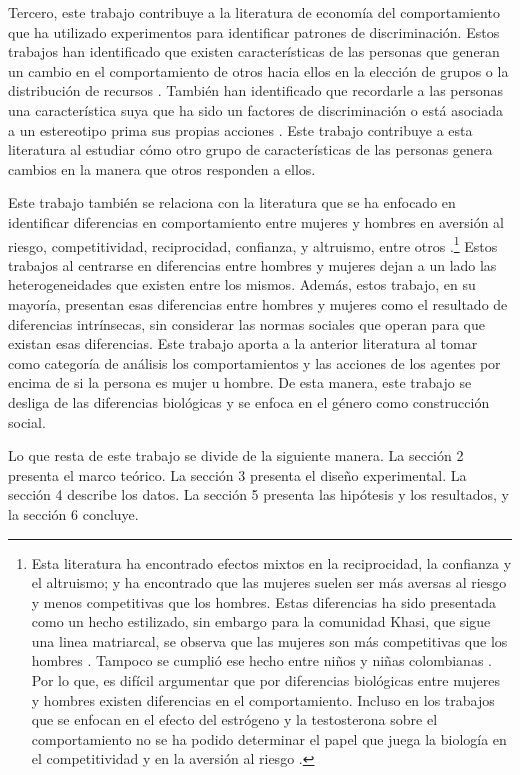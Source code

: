 Tercero, este trabajo contribuye a la literatura de economía del comportamiento que ha utilizado experimentos para identificar patrones de discriminación. Estos trabajos han identificado que existen características de las personas que generan un cambio en el comportamiento de otros hacia ellos en la elección de grupos o la distribución de recursos  \citep{cardenas2008discrimination, beautifulorwhite2012, howyoulookorspeak, mobius2006whybeautymatters}. También han identificado que recordarle a las personas una característica suya que ha sido un factores de discriminación o está asociada a un estereotipo prima sus propias acciones  \citep{hoffdiscriminationsocialidentity}. Este trabajo contribuye a esta literatura al estudiar cómo otro grupo de características de las personas genera cambios en la manera que otros responden a ellos. 

Este trabajo también se relaciona con la literatura que se ha enfocado en identificar diferencias en comportamiento entre mujeres y hombres en aversión al riesgo, competitividad, reciprocidad, confianza, y altruismo, entre otros \citep{gneezy2009gender, cardenas2012gender, croson2009gender, solnick2001genderultimatumgame, eckel2001chivalryultimatumgame, gomez2018gendernegociacion, buchan2008trustandgender, espinosa2015prosocialandgender}.\footnote{Esta literatura ha encontrado efectos mixtos en la reciprocidad, la confianza y el altruismo; y ha encontrado que las mujeres suelen ser más aversas al riesgo y menos competitivas que los hombres. Estas diferencias ha sido presentada como un hecho estilizado, sin embargo para la comunidad Khasi, que sigue una linea matriarcal, se observa que las mujeres son más competitivas que los hombres \citep{gneezy2009gender}. Tampoco se cumplió ese hecho entre niños y niñas colombianas \citep{cardenas2012gender}. Por lo que, es difícil argumentar que por diferencias biológicas entre mujeres y hombres existen diferencias en el comportamiento. Incluso en los trabajos que se enfocan en el efecto del estrógeno y la testosterona sobre el comportamiento no se ha podido determinar el papel que juega la biología en el competitividad y en la aversión al riesgo \citep{sapienza2009genderriskaversion,van2012testosteroneandcoperation,zethraeus2009rctestrogentestosterone,eisenegger2010testosteroneandbargainign}.}
Estos trabajos al centrarse en diferencias entre hombres y mujeres dejan a un lado las heterogeneidades que existen entre los mismos. Además, estos trabajo, en su mayoría, presentan esas diferencias entre hombres y mujeres como el resultado de diferencias intrínsecas, sin considerar las normas sociales que operan para que existan esas diferencias. Este trabajo aporta a la anterior literatura al tomar como categoría de análisis los comportamientos y las acciones de los agentes por encima de si la persona es mujer u hombre. De esta manera, este trabajo se desliga de las diferencias biológicas y se enfoca en el género como construcción social.

Lo que resta de este trabajo se divide de la siguiente manera. La sección 2 presenta el marco teórico. La sección 3 presenta el diseño experimental. La sección 4 describe los datos. La sección 5 presenta las hipótesis y los resultados, y la sección 6 concluye. 

